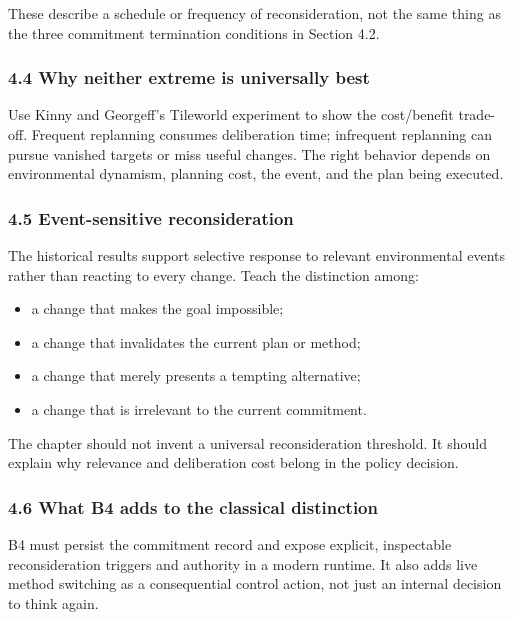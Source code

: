 These describe a schedule or frequency of reconsideration, not the same thing as the three commitment termination conditions in Section 4.2.\autocite{kinny1991commitment}

\subsubsection{4.4 Why neither extreme is universally best}\label{why-neither-extreme-is-universally-best}

Use Kinny and Georgeff's Tileworld experiment to show the cost/benefit trade-off. Frequent replanning consumes deliberation time; infrequent replanning can pursue vanished targets or miss useful changes. The right behavior depends on environmental dynamism, planning cost, the event, and the plan being executed.

\subsubsection{4.5 Event-sensitive reconsideration}\label{event-sensitive-reconsideration}

The historical results support selective response to relevant environmental events rather than reacting to every change. Teach the distinction among:

\begin{itemize}
\tightlist
\item
  a change that makes the goal impossible;
\item
  a change that invalidates the current plan or method;
\item
  a change that merely presents a tempting alternative;
\item
  a change that is irrelevant to the current commitment.
\end{itemize}

The chapter should not invent a universal reconsideration threshold. It should explain why relevance and deliberation cost belong in the policy decision.

\subsubsection{4.6 What B4 adds to the classical distinction}\label{what-b4-adds-to-the-classical-distinction}

B4 must persist the commitment record and expose explicit, inspectable reconsideration triggers and authority in a modern runtime. It also adds live method switching as a consequential control action, not just an internal decision to think again.

